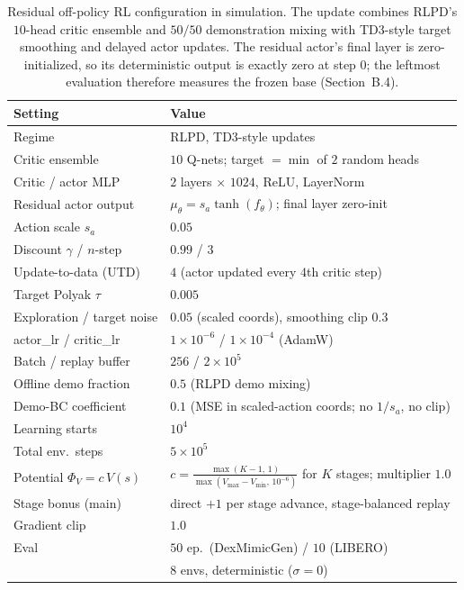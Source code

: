 \documentclass[letterpaper]{article} %
\begin{document}
\begin{table}[t]
\centering\small\setlength{\tabcolsep}{4pt}
\begin{tabular}{@{}p{}p{}@{}}
\toprule
Setting & Value \\
\midrule
Regime                          & RLPD, TD3-style updates \\
Critic ensemble                 & $10$ Q-nets; target $=\min$ of $2$ random heads \\
Critic / actor MLP              & $2$ layers $\times$ $1024$, ReLU, LayerNorm \\
Residual actor output           & $\mu_\theta=s_a\tanh(f_\theta)$; final layer zero-init \\
Action scale $s_a$              & $0.05$ \\
Discount $\gamma$ / $n$-step    & $0.99$ / $3$ \\
Update-to-data (UTD)            & $4$ (actor updated every $4$th critic step) \\
Target Polyak $\tau$            & $0.005$ \\
Exploration / target noise      & $0.05$ (scaled coords), smoothing clip $0.3$ \\
actor\_lr / critic\_lr          & $1{\times}10^{-6}$ / $1{\times}10^{-4}$ (AdamW) \\
Batch / replay buffer           & $256$ / $2{\times}10^{5}$ \\
Offline demo fraction           & $0.5$ (RLPD demo mixing) \\
Demo-BC coefficient             & $0.1$ (MSE in scaled-action coords; no $1/s_a$, no clip) \\
Learning starts                 & $10^{4}$ \\
Total env.\ steps               & $5{\times}10^{5}$ \\
Potential $\Phi_V=c\,V(s)$      & $c=\frac{\max(K-1,\,1)}{\max(V_{\max}-V_{\min},\,10^{-6})}$ for $K$ stages; multiplier $1.0$ \\
Stage bonus (main)              & direct $+1$ per stage advance, stage-balanced replay \\
Gradient clip                   & $1.0$ \\
Eval                            & $50$ ep.\ (DexMimicGen) / $10$ (LIBERO) \\
\quad                          & $8$ envs, deterministic ($\sigma{=}0$) \\
\bottomrule
\end{tabular}
\caption{Residual off-policy RL configuration in simulation. The update combines
RLPD's $10$-head critic ensemble and $50/50$ demonstration mixing with TD3-style
target smoothing and delayed actor updates. The residual actor's final layer is
zero-initialized, so its deterministic output is exactly zero at step $0$; the
leftmost evaluation therefore measures the frozen base (Section~B.4).}
\label{tab:simresrl}
\end{table}
\end{document}
